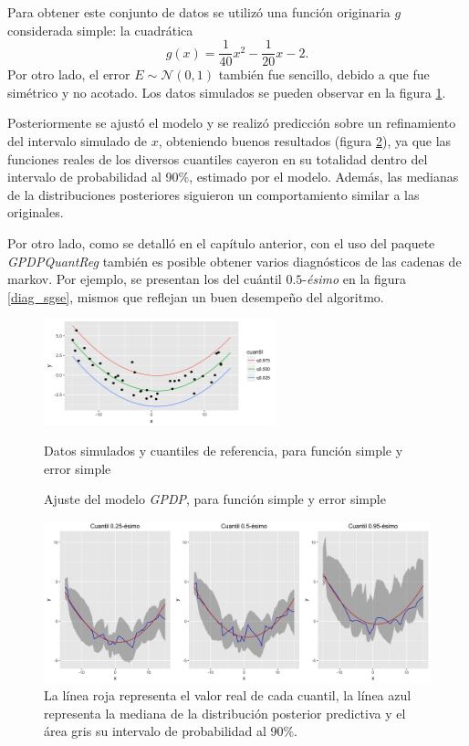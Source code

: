 Para obtener este conjunto de datos se utiliz\'o una funci\'on originaria $g$ considerada simple: la cuadr\'atica
\begin{equation*}
    g(x) = \frac{1}{40}x^2 - \frac{1}{20}x - 2.
\end{equation*}
Por otro lado, el error $E \sim \mathcal{N}(0,1)$ tambi\'en fue sencillo, debido a que fue sim\'etrico y no acotado. Los datos simulados se pueden observar en la figura \ref{sample_sgse}.

Posteriormente se ajust\'o el modelo y se realiz\'o predicci\'on sobre un refinamiento del intervalo simulado de $x$, obteniendo buenos resultados (figura \ref{fitted_sgse}), ya que las funciones reales de los diversos cuantiles cayeron en su totalidad dentro del intervalo de probabilidad al 90\%, estimado por el modelo. Adem\'as, las medianas de la distribuciones posteriores siguieron un comportamiento similar a las originales.

Por otro lado, como se detall\'o en el cap\'itulo anterior, con el uso del paquete \textit{GPDPQuantReg} tambi\'en es posible obtener varios diagn\'osticos de las cadenas de markov. Por ejemplo, se presentan los del cu\'antil $0.5$-\textit{\'esimo} en la figura \ref{diag_sgse}, mismos que reflejan un buen desempeño del algoritmo.

\begin{figure}[H]
	\centering
	\caption{Datos simulados y cuantiles de referencia, para funci\'on simple y error simple}
	\includegraphics[width=0.60\textwidth]{Figures/Simulation/simple_g_simple_error/sample.png}
	\label{sample_sgse}
\end{figure}

\begin{figure}[H]
	\centering
	\caption{Ajuste del modelo \textit{GPDP}, para funci\'on simple y error simple}
	\includegraphics[width=\textwidth]{Figures/Simulation/simple_g_simple_error/fitted_models.png}
	\captionsetup{singlelinecheck=off,font=footnotesize}
    \caption*{La l\'inea roja representa el valor real de cada cuantil, la l\'inea azul representa la mediana de la distribuci\'on posterior predictiva y el \'area gris su intervalo de probabilidad al 90\%.}
	\label{fitted_sgse}
\end{figure}

